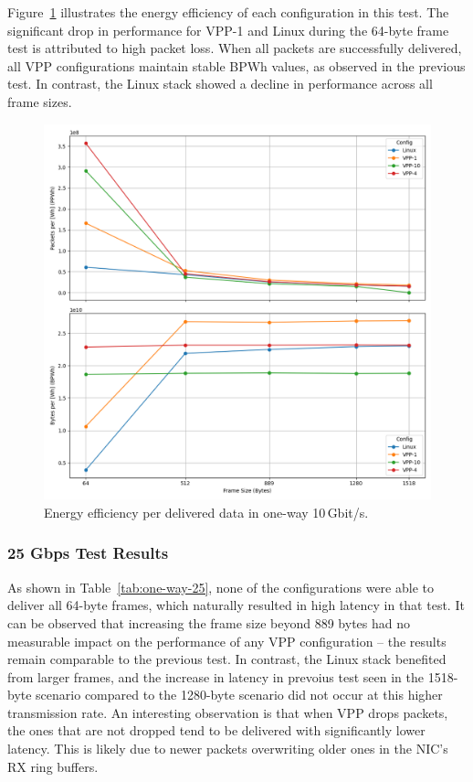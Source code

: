Figure~\ref{fig:10g} illustrates the energy efficiency of each configuration in this test.
The significant drop in performance for VPP-1 and Linux during the 64-byte frame test is attributed to high packet loss.
When all packets are successfully delivered, all VPP configurations maintain stable BPWh values, as observed in the previous test.
In contrast, the Linux stack showed a decline in performance across all frame sizes.

\begin{figure}[!htbp]
    \centering
    \includegraphics[width=\linewidth]{images/consumption-10g.png}
    \caption{Energy efficiency per delivered data in one-way 10\,Gbit/s.}
    \label{fig:10g}
\end{figure}



\subsubsection{25 Gbps Test Results}

As shown in Table~\ref{tab:one-way-25}, none of the configurations were able to deliver all 64-byte frames, which naturally resulted in high latency in that test.
It can be observed that increasing the frame size beyond 889 bytes had no measurable impact on the performance of any VPP configuration -- the results remain comparable to the previous test.
In contrast, the Linux stack benefited from larger frames, and the increase in latency in prevoius test seen in the 1518-byte scenario compared to the 1280-byte scenario 
did not occur at this higher transmission rate.
An interesting observation is that when VPP drops packets, the ones that are not dropped tend to be delivered with significantly lower latency.
This is likely due to newer packets overwriting older ones in the NIC’s RX ring buffers.

